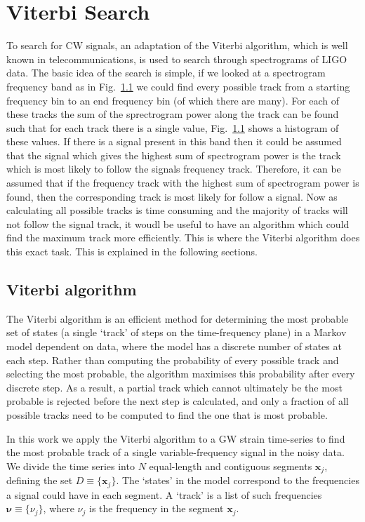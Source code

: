 \chapter{\label{viterbi}Viterbi Search}

To search for \ac{CW} signals, an adaptation of the Viterbi algorithm, which is well known in telecommunications, is used to search through spectrograms of \ac{LIGO} data. The basic idea of the search is simple, if we looked at a spectrogram frequency band as in Fig.~\ref{} we could find every possible track from a starting frequency bin to an end frequency bin (of which there are many). For each of these tracks the sum of the sprectrogram power along the track can be found such that for each track there is a single value, Fig.~\ref{} shows a histogram of these values. If there is a signal present in this band then it could be  assumed that the signal which gives the highest sum of spectrogram power is the track which is most likely to follow the signals frequency track.
Therefore, it can be assumed that if the frequency track with the highest sum of spectrogram power is found, then the corresponding track is most likely for follow a signal. 
Now as calculating all possible tracks is time consuming and the majority of tracks will not follow the signal track, it woudl be useful to have an algorithm which could find the maximum track more efficiently. This is where the Viterbi algorithm \cite{Viterbi} does this exact task. This is explained in the following sections.

\section{Viterbi algorithm}
%
%
The Viterbi algorithm is an efficient method for determining the most probable set of states (a single `track' of steps on the time-frequency plane) in a Markov model dependent on data, where the model has a discrete number of states at each step. Rather than computing the probability of every possible track and selecting the most probable, the algorithm maximises this probability after every discrete step. As a result, a partial track which cannot ultimately be the most probable is rejected before the next step is calculated, and only a fraction of all possible tracks need to be computed to find the one that is most probable.

%
%
In this work we apply the Viterbi algorithm to a \ac{GW} strain time-series to find the most probable track of a single variable-frequency signal in the noisy data.  We divide the time series into $N$ equal-length and contiguous segments ${\bm x}_j$,  defining the set $D \equiv \{{\bm x}_j\}$. The `states' in the model correspond to the frequencies a signal could have in each segment. A `track' is a list of such frequencies ${\bm \nu}\equiv \{\nu_j\}$, where  $\nu_j$ is the frequency in the segment ${\bm x_j}$.

